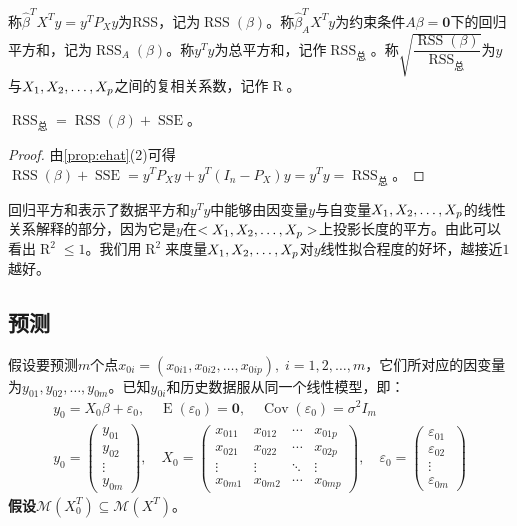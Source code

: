 \begin{definition}
	称$\hat{\beta}^TX^Ty=y^TP_Xy$为\gls{RSS}，记为$\operatorname{RSS}(\beta)$。称$\hat{\beta}_A^TX^Ty$为约束条件$A\beta=\mathbf{0}$下的回归平方和，记为$\operatorname{RSS}_A(\beta)$。称$y^Ty$为总平方和，记作$\operatorname{RSS}_{\text{总}}$。称$\sqrt{\dfrac{\operatorname{RSS}(\beta)}{\operatorname{RSS}_{\text{总}}}}$为$y$与$X_1, X_2, \dots, X_{p}$之间的复相关系数，记作$\operatorname{R}$。
\end{definition}
\begin{property}\label{prop:RSS=RSSbeta+SSE}
	$\operatorname{RSS}_{\text{总}}=\operatorname{RSS}(\beta)+\operatorname{SSE}$。
\end{property}
\begin{proof}
	由\cref{prop:ehat}(2)可得$\operatorname{RSS}(\beta)+\operatorname{SSE}=y^TP_Xy+y^T(I_n-P_X)y=y^Ty=\operatorname{RSS}_{\text{总}}$。
\end{proof}
\begin{note}
	回归平方和表示了数据平方和$y^Ty$中能够由因变量$y$与自变量$X_1, X_2, \dots, X_{p}$的线性关系解释的部分，因为它是$y$在$<X_1, X_2, \dots, X_{p}>$上投影长度的平方。由此可以看出$\operatorname{R}^2\leqslant1$。我们用$\operatorname{R}^2$来度量$X_1, X_2, \dots, X_{p}$对$y$线性拟合程度的好坏，越接近$1$越好。
\end{note}

\subsection{预测}
\label{def:LinearModelForcast}
假设要预测$m$个点$x_{0i}=(x_{0i1},x_{0i2},\dots,x_{0ip}),\;i=1,2,\dots,m$，它们所对应的因变量为$y_{01},y_{02},\dots,y_{0m}$。已知$y_{0i}$和历史数据服从同一个线性模型，即：
\begin{gather*}
	y_0=X_0\beta+\varepsilon_0,\quad\operatorname{E}(\varepsilon_0)=\mathbf{0},\quad\operatorname{Cov}(\varepsilon_0)=\sigma^2I_m \\
	y_0=
	\begin{pmatrix}
		y_{01} \\
		y_{02} \\
		\vdots \\
		y_{0m}
	\end{pmatrix},\quad
	X_0=
	\begin{pmatrix}
		x_{011} & x_{012} & \cdots & x_{01p} \\
		x_{021} & x_{022} & \cdots & x_{02p} \\
		\vdots & \vdots & \ddots & \vdots \\
		x_{0m1} & x_{0m2} & \cdots & x_{0mp} 
	\end{pmatrix},\quad
	\varepsilon_0=
	\begin{pmatrix}
		\varepsilon_{01} \\
		\varepsilon_{02} \\
		\vdots \\
		\varepsilon_{0m}
	\end{pmatrix}
\end{gather*}
\textbf{假设$\mathcal{M}(X_0^T)\subseteq\mathcal{M}(X^T)$}。
